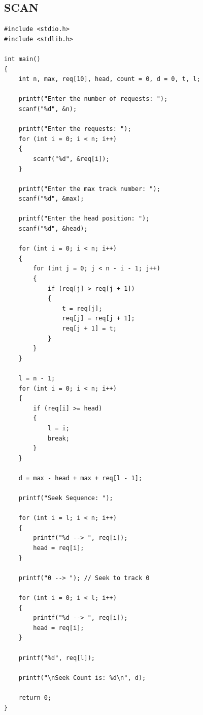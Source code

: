 \subsection{SCAN}
\begin{lstlisting}[label={list:c_program:queue}]
#include <stdio.h>
#include <stdlib.h>

int main()
{
    int n, max, req[10], head, count = 0, d = 0, t, l;

    printf("Enter the number of requests: ");
    scanf("%d", &n);

    printf("Enter the requests: ");
    for (int i = 0; i < n; i++)
    {
        scanf("%d", &req[i]);
    }

    printf("Enter the max track number: ");
    scanf("%d", &max);

    printf("Enter the head position: ");
    scanf("%d", &head);

    for (int i = 0; i < n; i++)
    {
        for (int j = 0; j < n - i - 1; j++)
        {
            if (req[j] > req[j + 1])
            {
                t = req[j];
                req[j] = req[j + 1];
                req[j + 1] = t;
            }
        }
    }

    l = n - 1;
    for (int i = 0; i < n; i++)
    {
        if (req[i] >= head)
        {
            l = i;
            break;
        }
    }

    d = max - head + max + req[l - 1];

    printf("Seek Sequence: ");

    for (int i = l; i < n; i++)
    {
        printf("%d --> ", req[i]);
        head = req[i];
    }

    printf("0 --> "); // Seek to track 0

    for (int i = 0; i < l; i++)
    {
        printf("%d --> ", req[i]);
        head = req[i];
    }

    printf("%d", req[l]);

    printf("\nSeek Count is: %d\n", d);

    return 0;
}
\end{lstlisting}


